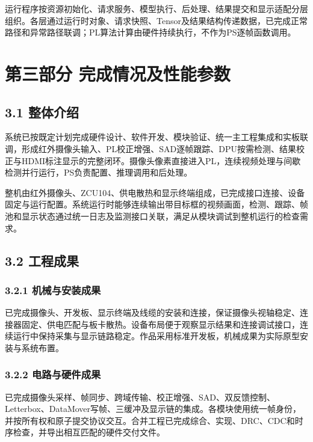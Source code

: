 \documentclass[UTF8,a4paper,12pt,fontset=windows]{ctexart}
\renewcommand{\arraystretch}{1.25}
\begin{document}
运行程序按资源初始化、请求服务、模型执行、后处理、结果提交和显示适配分层组织。各层通过运行时对象、请求快照、Tensor及结果结构传递数据，已完成正常路径和异常路径联调；PL算法计算由硬件持续执行，不作为PS逐帧函数调用。


\section*{第三部分 完成情况及性能参数}

\subsection*{3.1 整体介绍}

系统已按既定计划完成硬件设计、软件开发、模块验证、统一主工程集成和实板联调，形成红外摄像头输入、PL校正增强、SAD逐帧跟踪、DPU按需检测、结果校正与HDMI标注显示的完整闭环。摄像头像素直接进入PL，连续视频处理与间歇检测并行运行，PS负责配置、推理调用和后处理。

整机由红外摄像头、ZCU104、供电散热和显示终端组成，已完成接口连接、设备固定与运行配置。系统运行时能够连续输出带目标框的视频画面，检测、跟踪、帧池和显示状态通过统一日志及监测接口关联，满足从模块调试到整机运行的检查需求。


\subsection*{3.2 工程成果}

\subsubsection*{3.2.1 机械与安装成果}

已完成摄像头、开发板、显示终端及线缆的安装和连接，保证摄像头视轴稳定、连接器固定、供电匹配与板卡散热。设备布局便于观察显示结果和连接调试接口，连续运行中保持采集与显示链路稳定。作品采用标准开发板，机械成果为实际原型安装与系统布置。


\subsubsection*{3.2.2 电路与硬件成果}

已完成摄像头采样、帧同步、跨域传输、校正增强、SAD、双反馈控制、Letterbox、DataMover写帧、三缓冲及显示链的集成。各模块使用统一帧身份，并按所有权和原子提交协议交互。合并工程已完成综合、实现、DRC、CDC和时序检查，并导出相互匹配的硬件交付文件。

\begingroup
\footnotesize
\setlength{\tabcolsep}{4pt}
\renewcommand{\arraystretch}{1.2}
\end{document}
